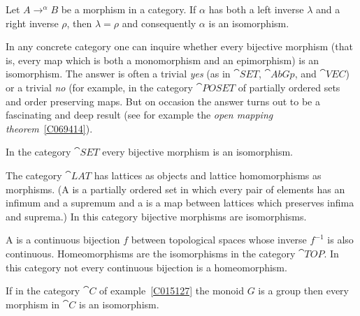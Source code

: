 \begin{prop} Let $A \to^\alpha B$ be a morphism in a category.  If $\alpha$ has both a left inverse $\lambda$ and a
right inverse $\rho$, then $\lambda = \rho$ and consequently $\alpha$ is an isomorphism.
\end{prop}

In any concrete category one can inquire whether every bijective morphism (that is, every
map which is both a monomorphism and an epimorphism) is an isomorphism.  The answer is
often a trivial \emph{yes} (as in $\cat{SET}$, $\cat{AbGp}$, and $\cat{VEC}$) or a trivial
\emph{no} (for example, in the category $\cat{POSET}$
of partially ordered sets and order preserving maps.  But on
occasion the answer turns out to be a fascinating and deep result (see for example the \emph{open mapping
theorem}~\ref{C069414}).

\begin{exam} In the category $\cat{SET}$
every bijective morphism is an isomorphism.
\end{exam}

\begin{exam}\label{C015216} The category
$\cat{LAT}$ has lattices as objects and lattice
homomorphisms as morphisms. (A
 is a partially ordered set in which every pair of elements has an infimum and a supremum and a
 is a map between lattices which preserves infima and suprema.)
In this category bijective morphisms
are isomorphisms.
\end{exam}

\begin{exam} A
 is a continuous bijection $f$ between topological spaces whose inverse $f^{-1}$ is also continuous.  Homeomorphisms
are the isomorphisms in the category $\cat{TOP}$.  In this category not every continuous bijection is a homeomorphism.
\end{exam}

\begin{exam} If in the category $\cat C$ of example~\ref{C015127} the monoid $G$ is a group
then every morphism in $\cat C$ is an isomorphism.
\end{exam}






